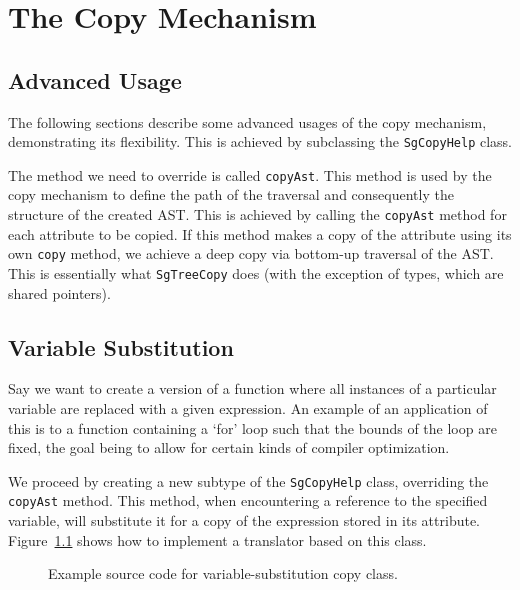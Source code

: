 \chapter{The Copy Mechanism}


\section{Advanced Usage}

The following sections describe some advanced usages of the copy
mechanism, demonstrating its flexibility.  This is achieved by subclassing
the {\tt SgCopyHelp} class.

The method we need to override is called {\tt copyAst}.  This method
is used by the copy mechanism to define the path of the traversal
and consequently the structure of the created AST.  This is achieved
by calling the {\tt copyAst} method for each attribute to be copied.
If this method makes a copy of the attribute using its own {\tt copy}
method, we achieve a deep copy via bottom-up traversal of the AST.
This is essentially what {\tt SgTreeCopy} does (with the exception of
types, which are shared pointers).

\section{Variable Substitution}

Say we want to create a version of a function where all instances of a
particular variable are replaced with a given expression.  An example of
an application of this is to a function containing a `for' loop such that
the bounds of the loop are fixed, the goal being to allow for certain
kinds of compiler optimization.

We proceed by creating a new subtype of the {\tt SgCopyHelp}
class, overriding the {\tt copyAst} method.  This method,
when encountering a reference to the specified variable, will
substitute it for a copy of the expression stored in its attribute.
Figure~\ref{Tutorial:example_varSubstCopy} shows how to implement a
translator based on this class.

\begin{figure}[!h]
{\indent
{\mySmallFontSize

\begin{latexonly}
   
\end{latexonly}

\begin{htmlonly}
   
\end{htmlonly}

}
}
\caption{Example source code for variable-substitution copy class.}
\label{Tutorial:example_varSubstCopy}
\end{figure}


